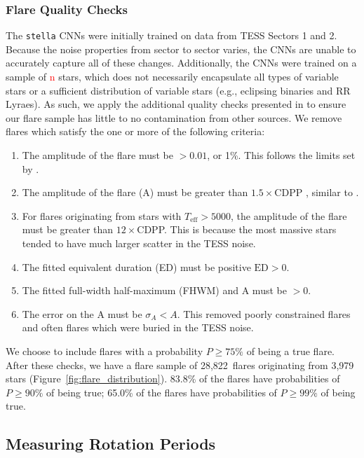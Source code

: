 \documentclass[twocolumn]{aastex631}
\begin{document}
\subsubsection{Flare Quality Checks}

The \texttt{stella} CNNs were initially trained on data from TESS Sectors 1 and 2.
Because the noise properties from sector to sector varies, the CNNs are unable to accurately
capture all of these changes. Additionally, the CNNs were trained on a sample of \textcolor{red}{n}
stars, which does not necessarily encapsulate all types of variable stars or a sufficient distribution
of variable stars (e.g., eclipsing binaries and RR Lyraes). As such, we apply the additional
quality checks presented in \cite{Feinstein22} to ensure our flare sample has little to no contamination
from other sources. We remove flares which satisfy the one or more of the following criteria:

\begin{enumerate}
  \item The amplitude of the flare must be $> 0.01$, or 1\%. This follows the limits set by
        \cite{feinstein20}.
  \item The amplitude of the flare (A) must be greater than $1.5\times$CDPP \citep[Combined Differential
        Photometric Precision;][]{christiansen12}, similar to \cite{Feinstein22}.
  \item For flares originating from stars with $T_\textrm{eff} > 5000$, the amplitude of the flare
        must be greater than $12\times$CDPP. This is because the most massive stars tended to have
        much larger scatter in the TESS noise.
  \item The fitted equivalent duration (ED) must be positive $\textrm{ED} > 0$.
  \item The fitted full-width half-maximum (FHWM) and A must be $> 0$.
  \item The error on the A must be $\sigma_A < A$. This removed poorly constrained flares and often
        flares which were buried in the TESS noise.
\end{enumerate}

We choose to include flares with a probability $P \geq 75\%$ of being
a true flare. After these checks, we have a flare sample of 28,822~flares originating
from 3,979 stars (Figure~\ref{fig:flare_distribution}). 83.8\% of the flares have
probabilities of $P \geq 90\%$ of being true; 65.0\% of the flares have probabilities
of $P \geq 99\%$ of being true.

\subsection{Measuring Rotation Periods}\label{subsec:prot}
\end{document}

